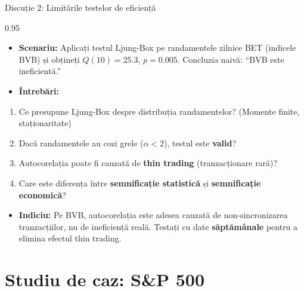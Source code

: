 \documentclass[9pt, aspectratio=169, t]{beamer}
\begin{document}
\begin{frame}{Discuție 2: Limitările testelor de eficiență}
\begin{cminipage}{0.95\textwidth}
    \begin{itemize}\setlength{\itemsep}{0pt}
        \item \textbf{Scenariu:} Aplicați testul Ljung-Box pe randamentele zilnice BET (indicele BVB) și obțineți $Q(10) = 25.3$, $p = 0.005$. Concluzia naivă: ``BVB este ineficientă.''
        \item \textbf{Întrebări:}
    \end{itemize}
    \begin{enumerate}\setlength{\itemsep}{0pt}
        \item Ce presupune Ljung-Box despre distribuția randamentelor? (Momente finite, staționaritate)
        \item Dacă randamentele au cozi grele ($\alpha < 2$), testul este \textbf{valid}?
        \item Autocorelația poate fi cauzată de \textbf{thin trading} (tranzacționare rară)?
        \item Care este diferența între \textbf{semnificație statistică} și \textbf{semnificație economică}?
    \end{enumerate}

    \vspace{0.2cm}
    \begin{itemize}\setlength{\itemsep}{0pt}
        \item \textbf{Indiciu:} Pe BVB, autocorelația este adesea cauzată de non-sincronizarea tranzacțiilor, nu de ineficiență reală. Testați cu date \textbf{săptămânale} pentru a elimina efectul thin trading.
    \end{itemize}
\end{cminipage}
\end{frame}

\section{Studiu de caz: S\&P 500}
\end{document}
